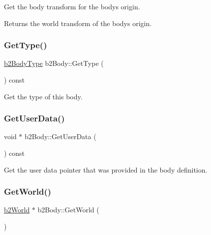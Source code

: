 Get the body transform for the body\textquotesingle{}s origin. \begin{DoxyReturn}{Returns}
the world transform of the body\textquotesingle{}s origin. 
\end{DoxyReturn}
\mbox{\label{classb2_body_a9c2234b5a5fff91305a65ecd0cf0ee59}} 
\subsubsection{\texorpdfstring{GetType()}{GetType()}}
{\footnotesize\ttfamily \mbox{\hyperlink{b2_body_8h_a74ddb02261648c2bff691a866b5c03e0}{b2\+Body\+Type}} b2\+Body\+::\+Get\+Type (\begin{DoxyParamCaption}{ }\end{DoxyParamCaption}) const\hspace{0.3cm}{\ttfamily [inline]}}



Get the type of this body. 

\mbox{\label{classb2_body_a672c782f7184faf3d673b08681dd63e3}} 
\subsubsection{\texorpdfstring{GetUserData()}{GetUserData()}}
{\footnotesize\ttfamily void $\ast$ b2\+Body\+::\+Get\+User\+Data (\begin{DoxyParamCaption}{ }\end{DoxyParamCaption}) const\hspace{0.3cm}{\ttfamily [inline]}}



Get the user data pointer that was provided in the body definition. 

\mbox{\label{classb2_body_abfd9466763b20977f9122d0e162dfeb9}} 
\subsubsection{\texorpdfstring{GetWorld()}{GetWorld()}\hspace{0.1cm}{\footnotesize\ttfamily [1/2]}}
{\footnotesize\ttfamily \mbox{\hyperlink{classb2_world}{b2\+World}} $\ast$ b2\+Body\+::\+Get\+World (\begin{DoxyParamCaption}{ }\end{DoxyParamCaption})\hspace{0.3cm}{\ttfamily [inline]}}



